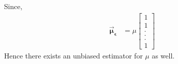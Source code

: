 \documentclass[journal,12pt,onecolumn]{IEEEtran}
\providecommand{\mtx}[1]{\mathbf{#1}}
\theoremstyle{remark}
\begin{document}
Since,
\begin{align}
\vec{\boldsymbol{\mu}}_{\boldsymbol{{\epsilon}}}&=\mu \begin{bmatrix}
1 \\%
1 \\%
. \\[-10pt]
. \\[-10pt]
. \\[5pt]
1
\end{bmatrix}
\end{align}
Hence there exists an unbiased estimator for $\mu$ as well.
\end{document}
